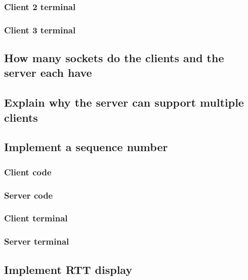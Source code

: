 \documentclass[a4paper,12pt]{article}
\begin{document}
\subsubsection{Client 2 terminal}

\subsubsection{Client 3 terminal}

\subsection{How many sockets do the clients and the server each have}

\subsection{Explain why the server can support multiple clients}

\subsection{Implement a sequence number}

\subsubsection{Client code}

\subsubsection{Server code}

\subsubsection{Client terminal}

\subsubsection{Server terminal}

\subsection{Implement RTT display}
\end{document}
